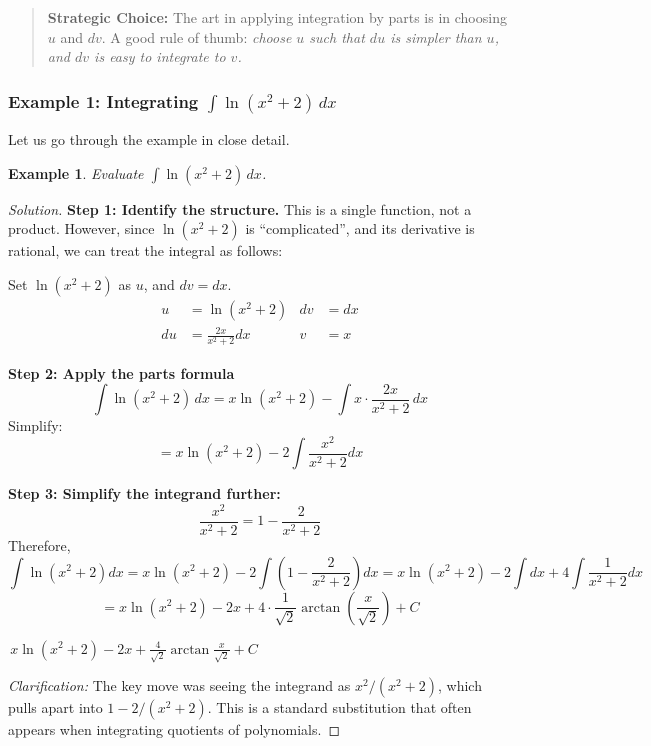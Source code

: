 \documentclass[11pt]{article}
\newtheorem{example}[definition]{Example}
\theoremstyle{definition}
\begin{document}
\begin{quote}
\textbf{Strategic Choice:} The art in applying integration by parts is in choosing $u$ and $dv$. A good rule of thumb: \emph{choose $u$ such that $du$ is simpler than $u$, and $dv$ is easy to integrate to $v$.}
\end{quote}

\subsubsection*{Example 1: Integrating $\int \ln(x^2 + 2)\, dx$}

Let us go through the example in close detail.

\begin{example}\label{ex:lnx2plus2}
Evaluate $\displaystyle \int \ln(x^2 + 2)\, dx$.
\end{example}

\begin{proof}[Solution]
\textbf{Step 1: Identify the structure.} This is a single function, not a product. However, since $\ln(x^2+2)$ is ``complicated'', and its derivative is rational, we can treat the integral as follows:

Set $\ln(x^2 + 2)$ as $u$, and $dv = dx$.
\begin{align*}
    u &= \ln(x^2 + 2) & dv &= dx \\
    du &= \frac{2x}{x^2+2}dx & v &= x
\end{align*}

\textbf{Step 2: Apply the parts formula}
\[
\int \ln(x^2+2)\, dx = x \ln(x^2+2) - \int x \cdot \frac{2x}{x^2+2}\, dx
\]
Simplify:
\[
= x \ln(x^2+2) - 2 \int \frac{x^2}{x^2+2} dx
\]

\textbf{Step 3: Simplify the integrand further:}
\[
\frac{x^2}{x^2+2} = 1 - \frac{2}{x^2+2}
\]
Therefore,
\[
\int \ln(x^2+2) dx = x \ln(x^2+2) - 2 \int \left(1 - \frac{2}{x^2+2}\right) dx
= x \ln(x^2+2) - 2\int dx + 4\int \frac{1}{x^2+2} dx 
\]
\[
= x \ln(x^2+2) - 2x + 4 \cdot \frac{1}{\sqrt{2}} \arctan\left(\frac{x}{\sqrt{2}}\right) + C
\]

\begin{flushright}
    $\boxed{\,x \ln(x^2 + 2) - 2x + \frac{4}{\sqrt{2}} \arctan \frac{x}{\sqrt{2}} + C\,}$
\end{flushright}

\textit{Clarification:} The key move was seeing the integrand as $x^2/(x^2 + 2)$, which pulls apart into $1 - 2/(x^2 + 2)$. This is a standard substitution that often appears when integrating quotients of polynomials.
\end{proof}
\end{document}
